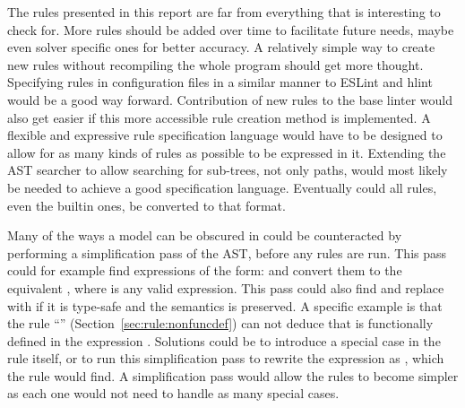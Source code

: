 \documentclass[a4paper,12pt]{article}
\newcommand{\ruleref}[1]{``\nameref{sec:rule:#1}'' (Section~\ref{sec:rule:#1})}
\begin{document}
The rules presented in this report are far from everything that is interesting to check
for. More rules should be added over time to facilitate future needs, maybe even solver
specific ones for better accuracy. A relatively simple way to create new rules without
recompiling the whole program should get more thought. Specifying rules in configuration
files in a similar manner to ESLint and hlint would be a good way forward. Contribution of
new rules to the base linter would also get easier if this more accessible rule creation
method is implemented. A flexible and expressive rule specification language would have to
be designed to allow for as many kinds of rules as possible to be expressed in it.
Extending the AST searcher to allow searching for sub-trees, not only paths, would most
likely be needed to achieve a good specification language. Eventually could all rules,
even the builtin ones, be converted to that format.

Many of the ways a model can be obscured in could be counteracted by performing a
simplification pass of the AST, before any rules are run. This pass could for example find
expressions of the form:  and convert them to the equivalent , where
 is any valid expression. This pass could also find \mi{[a]} and replace with 
if it is type-safe and the semantics is preserved. A specific example is that the rule
\ruleref{nonfuncdef} can not deduce that  is functionally defined in the expression
\mi{[a] = [b+1]}. Solutions could be to introduce a special case in the rule itself, or to
run this simplification pass to rewrite the expression as , which the rule
would find. A simplification pass would allow the rules to become simpler as each one
would not need to handle as many special cases.


%


\newpage

\end{document}
